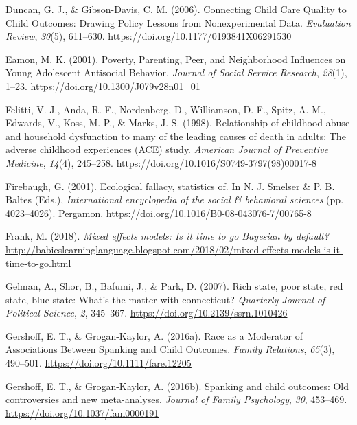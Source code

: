 \documentclass[
  letterpaper,
  DIV=11,
  numbers=noendperiod]{scrreprt}
\newlength{\cslhangindent}
\newenvironment{CSLReferences}[2] %
 {\begin{list}{}{%
  \setlength{\itemindent}{0pt}
  \setlength{\leftmargin}{0pt}
  \setlength{\parsep}{0pt}
  \ifodd #1
   \setlength{\leftmargin}{\cslhangindent}
   \setlength{\itemindent}{-1\cslhangindent}
  \fi
  \setlength{\itemsep}{#2\baselineskip}}}
 {\end{list}}
\begin{document}
\begin{CSLReferences}{1}{0}
Duncan, G. J., \& Gibson-Davis, C. M. (2006). {Connecting Child Care
Quality to Child Outcomes: Drawing Policy Lessons from Nonexperimental
Data}. \emph{Evaluation Review}, \emph{30}(5), 611--630.
\url{https://doi.org/10.1177/0193841X06291530}

Eamon, M. K. (2001). {Poverty, Parenting, Peer, and Neighborhood
Influences on Young Adolescent Antisocial Behavior}. \emph{Journal of
Social Service Research}, \emph{28}(1), 1--23.
\url{https://doi.org/10.1300/J079v28n01_01}

Felitti, V. J., Anda, R. F., Nordenberg, D., Williamson, D. F., Spitz,
A. M., Edwards, V., Koss, M. P., \& Marks, J. S. (1998). Relationship of
childhood abuse and household dysfunction to many of the leading causes
of death in adults: The adverse childhood experiences (ACE) study.
\emph{American Journal of Preventive Medicine}, \emph{14}(4), 245--258.
\url{https://doi.org/10.1016/S0749-3797(98)00017-8}

Firebaugh, G. (2001). Ecological fallacy, statistics of. In N. J.
Smelser \& P. B. Baltes (Eds.), \emph{International encyclopedia of the
social \& behavioral sciences} (pp. 4023--4026). Pergamon.
\url{https://doi.org/10.1016/B0-08-043076-7/00765-8}

Frank, M. (2018). \emph{Mixed effects models: Is it time to go
{B}ayesian by default?}
\url{http://babieslearninglanguage.blogspot.com/2018/02/mixed-effects-models-is-it-time-to-go.html}

Gelman, A., Shor, B., Bafumi, J., \& Park, D. (2007). Rich state, poor
state, red state, blue state: What's the matter with connecticut?
\emph{Quarterly Journal of Political Science}, \emph{2}, 345--367.
\url{https://doi.org/10.2139/ssrn.1010426}

Gershoff, E. T., \& Grogan-Kaylor, A. (2016a). {Race as a Moderator of
Associations Between Spanking and Child Outcomes}. \emph{Family
Relations}, \emph{65}(3), 490--501.
\url{https://doi.org/10.1111/fare.12205}

Gershoff, E. T., \& Grogan-Kaylor, A. (2016b). Spanking and child
outcomes: Old controversies and new meta-analyses. \emph{Journal of
Family Psychology}, \emph{30}, 453--469.
\url{https://doi.org/10.1037/fam0000191}


\end{CSLReferences}
\end{document}
